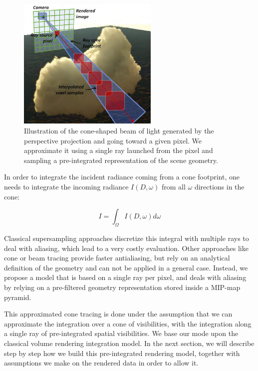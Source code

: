 \begin{figure}\label{f:vct-aliasing}
	\begin{center}
		\includegraphics[width=0.6\textwidth]{graphics/vct/vct-6-1}
	\end{center}
	\caption{Illustration of the cone-shaped beam of light generated by the perspective projection and going toward a given pixel. We approximate it using a single ray launched from the pixel and sampling a pre-integrated representation of the scene geometry.}
\end{figure}

In order to integrate the incident radiance coming from a cone footprint, one needs to integrate the incoming radiance $I(D,\omega)$ from all $\omega$ directions in the cone:

\begin{equation*}
	I=\int_\Omega I(D,\omega)d\omega
\end{equation*}

Classical supersampling approaches discretize this integral with multiple rays to deal with aliasing, which lead to a very costly evaluation. Other approaches like cone or beam tracing provide faster antialiasing, but rely on an analytical definition of the geometry and can not be applied in a general case. Instead, we propose a model that is based on a single ray per pixel, and deals with aliasing by relying on a pre-filtered geometry representation stored inside a MIP-map pyramid.

This approximated cone tracing is done under the assumption that we can approximate the integration over a cone of visibilities, with the integration along a single ray of pre-integrated spatial visibilities. We base our mode upon the classical volume rendering integration model. In the next section, we will describe step by step how we build this pre-integrated rendering model, together with assumptions we make on the rendered data in order to allow it. 



